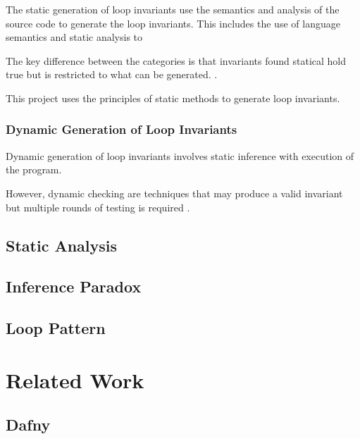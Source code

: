 The static generation of loop invariants use the
semantics and analysis of the source code to generate the loop invariants.
This includes the use of language semantics and static analysis to 

The key difference between the categories is
that invariants found statical hold true
but is restricted to what can be generated.
\cite{benderfinding}\cite{Leino2005LoopIO}.

This project uses the principles of static methods to
generate loop invariants.

\subsubsection{Dynamic Generation of Loop Invariants}

Dynamic generation of loop invariants involves static inference
with execution of the program.


However, dynamic checking are techniques that may produce
a valid invariant but multiple rounds of testing is required
\cite{infer-dynamic} \cite{infer-postconditions}.

\subsection{Static Analysis}

\subsection{Inference Paradox}

\cite{infer-postconditions}

\subsection{Loop Pattern}

\cite{patterns}

\section{Related Work}

\subsection{Dafny}

